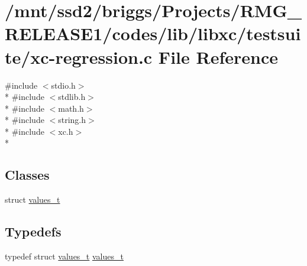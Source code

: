\hypertarget{xc-regression_8c}{\section{/mnt/ssd2/briggs/\-Projects/\-R\-M\-G\-\_\-\-R\-E\-L\-E\-A\-S\-E1/codes/lib/libxc/testsuite/xc-\/regression.c File Reference}
\label{xc-regression_8c}
}
{\ttfamily \#include $<$stdio.\-h$>$}\\*
{\ttfamily \#include $<$stdlib.\-h$>$}\\*
{\ttfamily \#include $<$math.\-h$>$}\\*
{\ttfamily \#include $<$string.\-h$>$}\\*
{\ttfamily \#include $<$xc.\-h$>$}\\*
\subsection*{Classes}
\begin{DoxyCompactItemize}
\item 
struct \hyperlink{structvalues__t}{values\-\_\-t}
\end{DoxyCompactItemize}
\subsection*{Typedefs}
\begin{DoxyCompactItemize}
\item 
typedef struct \hyperlink{structvalues__t}{values\-\_\-t} \hyperlink{xc-regression_8c_aae2ee2c76d89f2a35ccf2ee100e04df6}{values\-\_\-t}
\end{DoxyCompactItemize}
